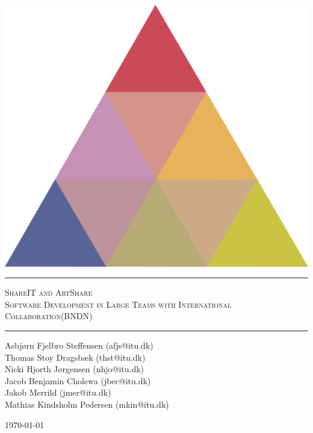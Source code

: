 \begin{titlepage}
\begin{center}

\vspace{2cm}

\includegraphics[scale=0.5]{./img/logo.png}

\rule{\linewidth}{0.6mm}

\textsc{\LARGE ShareIT and ArtShare} \\
\textsc{Software Development in Large Teams with International Collaboration(BNDN)}
\vspace{0.2cm}
\rule{\linewidth}{0.4mm}

Asbj\o rn Fjelbro Steffensen (afjs@itu.dk)\\ Thomas Stoy Dragsb\ae k (thst@itu.dk)\\ Nicki Hjorth J\o rgensen (nhjo@itu.dk)\\ Jacob Benjamin Cholewa (jbec@itu.dk)\\ Jakob Merrild (jmer@itu.dk)\\ Mathias Kindsholm Pedersen (mkin@itu.dk)

\vfill

\large \today
\end{center}


\end{titlepage}